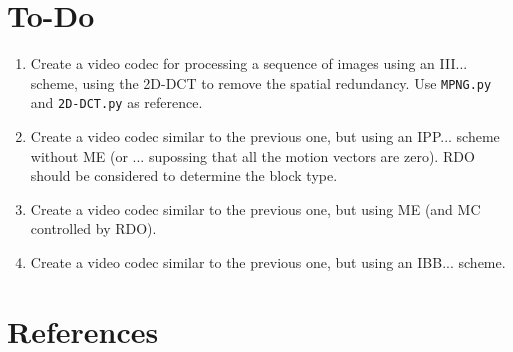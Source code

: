\section{To-Do}

\begin{enumerate}
\item Create a video codec for processing a sequence of images using an
  III... scheme, using the 2D-DCT to remove the spatial
  redundancy. Use \texttt{MPNG.py} and \texttt{2D-DCT.py} as
  reference.
\item Create a video codec similar to the previous one, but using an
  IPP... scheme without ME (or ... supossing that all the motion vectors are
  zero). RDO should be considered to determine the block
  type.
\item Create a video codec similar to the previous one, but using ME
  (and MC controlled by RDO).
\item Create a video codec similar to the previous one, but using an
  IBB... scheme.
\end{enumerate}

  
\section{References}

\renewcommand{\addcontentsline}[3]{}%


